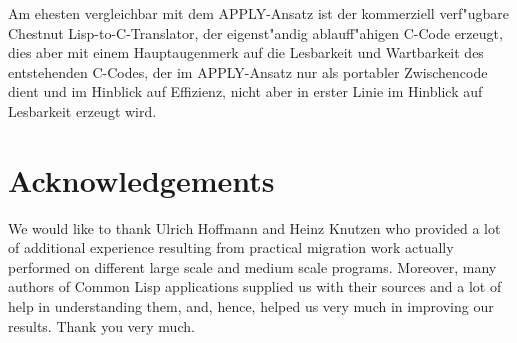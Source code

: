 Am ehesten vergleichbar mit dem APPLY-Ansatz ist der kommerziell
verf"ugbare Chestnut Lisp-to-C-Translator, der eigenst"andig
ablauf\/f"ahigen C-Code erzeugt, dies aber mit einem Hauptaugenmerk auf
die Lesbarkeit und Wartbarkeit des entstehenden C-Codes, der im
APPLY-Ansatz nur als portabler Zwischencode dient und im Hinblick auf
Effizienz, nicht aber in erster Linie im Hinblick auf Lesbarkeit
erzeugt wird. 

\section{Acknowledgements}

We would like to thank Ulrich Hoffmann and Heinz Knutzen who provided
a lot of additional experience resulting from practical migration work
actually performed on different large scale and medium scale programs.
Moreover, many authors of Common Lisp applications supplied us with
their sources and a lot of help in understanding them, and, hence,
helped us very much in improving our results. Thank you very much.


\nocite{Wand/Friedman86}
\nocite{Smith84}
\nocite{Smith82}
\nocite{CLiCC91}
\nocite{gosi91}
\nocite{APPLY/IfKI/I.1/1}



